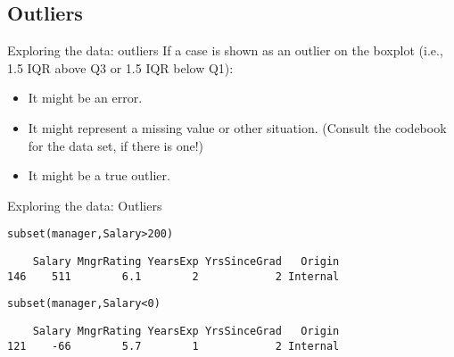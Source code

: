 \documentclass{beamer}\usepackage[]{graphicx}\usepackage[]{color}
\makeatletter
\newcommand{\hlnum}[1]{\textcolor[rgb]{0.824,0.412,0.118}{#1}}%
\newcommand{\hlstr}[1]{\textcolor[rgb]{1,0.894,0.71}{#1}}%
\newcommand{\hlopt}[1]{\textcolor[rgb]{1,0.894,0.769}{#1}}%
\newcommand{\hlstd}[1]{\textcolor[rgb]{1,0.894,0.769}{#1}}%
\newcommand{\hlkwc}[1]{\textcolor[rgb]{0.78,0.941,0.545}{#1}}%
\newcommand{\hlkwd}[1]{\textcolor[rgb]{1,0.78,0.769}{#1}}%
\newenvironment{kframe}{%
 \def\at@end@of@kframe{}%
 \ifinner\ifhmode%
  \def\at@end@of@kframe{\end{minipage}}%
  \begin{minipage}{\columnwidth}%
 \fi\fi%
 \def\FrameCommand##1{\hskip\@totalleftmargin \hskip-\fboxsep
 \colorbox{shadecolor}{##1}\hskip-\fboxsep
     \hskip-\linewidth \hskip-\@totalleftmargin \hskip\columnwidth}%
 \MakeFramed {\advance\hsize-\width
   \@totalleftmargin\z@ \linewidth\hsize
   \@setminipage}}%
 {\par\unskip\endMakeFramed%
 \at@end@of@kframe}
\newenvironment{knitrout}{}{} %
\makeatother
\begin{document}
\begin{darkframes}
    \section{Outliers}


    \begin{frame}{Exploring the data: outliers}
      If a case is shown as an outlier on the boxplot (i.e., 1.5 IQR above Q3 or 1.5 IQR below Q1):
      \begin{itemize}
        \item It might be an error.
        \item It might represent a missing value or other situation. (Consult the codebook for the data set, if there is one!)
        \item It might be a true outlier.
      \end{itemize}
    \end{frame}

    \begin{frame}[fragile]{Exploring the data: Outliers}
\begin{knitrout}
\begin{kframe}
\begin{alltt}
\hlkwd{subset}\hlstd{(manager, Salary} \hlopt{>} \hlnum{200}\hlstd{)}
\end{alltt}
\begin{verbatim}
    Salary MngrRating YearsExp YrsSinceGrad   Origin
146    511        6.1        2            2 Internal
\end{verbatim}
\begin{alltt}
\hlkwd{subset}\hlstd{(manager, Salary} \hlopt{<} \hlnum{0}\hlstd{)}
\end{alltt}
\begin{verbatim}
    Salary MngrRating YearsExp YrsSinceGrad   Origin
121    -66        5.7        1            2 Internal
\end{verbatim}
\end{kframe}
\end{knitrout}
      \pause


\end{frame}
\end{darkframes}
\end{document}
